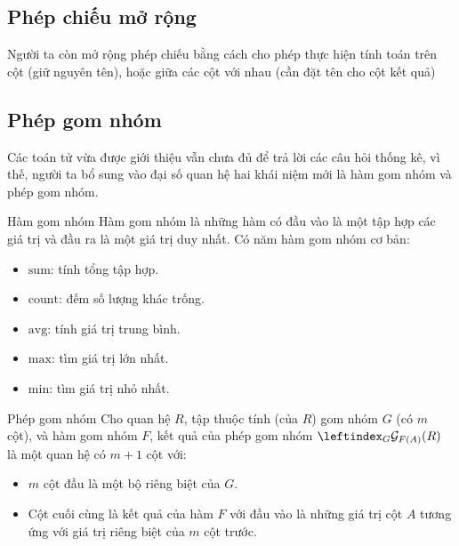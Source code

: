 \documentclass[11pt]{beamer}
\begin{document}
  \subsection{Phép chiếu mở rộng}
  \begin{frame}
    Người ta còn mở rộng phép chiếu bằng cách cho phép thực hiện tính toán trên cột (giữ nguyên tên),
    hoặc giữa các cột với nhau (cần đặt tên cho cột kết quả)
  \end{frame}
  \subsection{Phép gom nhóm}
  \begin{frame}
    Các toán tử vừa được giới thiệu vẫn chưa đủ để trả lời các câu hỏi thống kê, 
    vì thế, người ta bổ sung vào đại số quan hệ hai khái niệm mới là hàm gom nhóm và phép gom nhóm.
  \end{frame}
  \begin{frame}{Hàm gom nhóm}
    Hàm gom nhóm là những hàm có đầu vào là một tập hợp các giá trị và đầu ra là một giá trị duy nhất.
    Có năm hàm gom nhóm cơ bản:
    \begin{itemize}
      \item $\mathrm{sum}$: tính tổng tập hợp.
      \item $\mathrm{count}$: đếm số lượng khác trống.
      \item $\mathrm{avg}$: tính giá trị trung bình.
      \item $\mathrm{max}$: tìm giá trị lớn nhất.
      \item $\mathrm{min}$: tìm giá trị nhỏ nhất.
    \end{itemize}
  \end{frame}
  \begin{frame}{Phép gom nhóm}
    Cho quan hệ $R$, tập thuộc tính (của $R$) gom nhóm $G$ (có $m$ cột), và hàm gom nhóm $F$, 
    kết quả của phép gom nhóm $\leftindex_{G}{\mathcal{G}}_{F(A)}(R)$ 
    là một quan hệ có $m+1$ cột với:
    \begin{itemize}
      \item $m$ cột đầu là một bộ riêng biệt của $G$.
      \item Cột cuối cùng là kết quả của hàm $F$ với đầu vào là những giá trị cột $A$ 
      tương ứng với giá trị riêng biệt của $m$ cột trước.
    \end{itemize}
  \end{frame}
\end{document}
